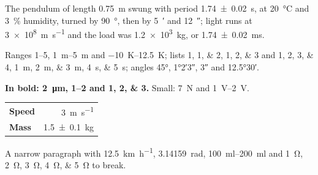 \documentclass{article}
\begin{document}
The pendulum of length \SI{0.75}{\metre} swung with period \SI{1.74 \pm 0.02}{\second}, at
\qty{20}{\degreeCelsius} and \qty{3}{\percent} humidity, turned by \qty{90}{\degree}, then by
\qty{5}{\arcminute} and \qty{12}{\arcsecond}; light runs at \SI{3e8}{\metre\per\second} and
the load was \qty{1.2e3}{\kilo\gram}, or \SI{1.74 \pm 0.02}{\milli\second}.

Ranges \numrange{1}{5}, \SIrange{1}{5}{\metre} and \qtyrange{-10}{12.5}{\kelvin}; lists
\numlist{1}, \numlist{1;2}, \numlist{1;2;3} and \numlist{1; 2; 3; 4}, \SIlist{1;2;3}{\metre},
\qtylist{4;5}{\second}; angles \ang{45}, \ang{1;2;3}, \ang{;;3} and \ang{12.5;30}.

\textbf{In bold: \SI{2}{\micro\metre}, \numrange{1}{2} and \numlist{1;2;3}.}
{\small Small: \qty{7}{\newton} and \qtyrange{1}{2}{\volt}.}

\begin{tabular}{|>{\bfseries}l|r|}
\hline\hline
Speed & \qty{3}{\metre\per\second} \\
Mass & \SI{1.5 \pm 0.1}{\kilo\gram} \\
\hline
\end{tabular}

\begin{minipage}{4cm}
A narrow paragraph with \qty{12.5}{\kilo\metre\per\hour}, \qty{3.14159}{\radian},
\SIrange{100}{200}{\milli\litre} and \qtylist{1;2;3;4;5}{\ohm} to break.
\end{minipage}
\end{document}

